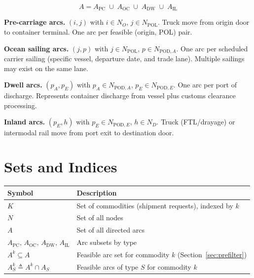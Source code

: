 \documentclass[11pt,a4paper]{article}
\newcommand{\defeq}{\triangleq}
\theoremstyle{definition}
\begin{document}
\[
  A = A_{\text{PC}} \;\cup\; A_{\text{OC}} \;\cup\; A_{\text{DW}} \;\cup\; A_{\text{IL}}
\]

\begin{description}[style=nextline, leftmargin=3cm, labelwidth=2.8cm]
  \item[$A_{\text{PC}}$] \textbf{Pre-carriage arcs.} $(i, j)$ with $i \in N_O$,
        $j \in N_{\text{POL}}$. Truck move from origin door to container terminal.
        One arc per feasible (origin, POL) pair.

  \item[$A_{\text{OC}}$] \textbf{Ocean sailing arcs.} $(j, p)$ with $j \in N_{\text{POL}}$,
        $p \in N_{\text{POD},A}$. One arc per scheduled carrier sailing (specific vessel,
        departure date, and trade lane). Multiple sailings may exist on the same lane.

  \item[$A_{\text{DW}}$] \textbf{Dwell arcs.} $(p_A, p_E)$ with $p_A \in N_{\text{POD},A}$,
        $p_E \in N_{\text{POD},E}$. One arc per port of discharge. Represents container
        discharge from vessel plus customs clearance processing.

  \item[$A_{\text{IL}}$] \textbf{Inland arcs.} $(p_E, h)$ with $p_E \in N_{\text{POD},E}$,
        $h \in N_D$. Truck (FTL/drayage) or intermodal rail move from port exit to
        destination door.
\end{description}

\section{Sets and Indices}

\begin{center}
\begin{tabular}{ll}
\toprule
Symbol & Description \\
\midrule
$K$ & Set of commodities (shipment requests), indexed by $k$ \\
$N$ & Set of all nodes \\
$A$ & Set of all directed arcs \\
$A_{\text{PC}},\, A_{\text{OC}},\, A_{\text{DW}},\, A_{\text{IL}}$ & Arc subsets by type \\
$A^k \subseteq A$ & Feasible arc set for commodity $k$ (Section~\ref{sec:prefilter}) \\
$A^k_S \defeq A^k \cap A_S$ & Feasible arcs of type $S$ for commodity $k$ \\
\bottomrule
\end{tabular}
\end{center}
\end{document}
